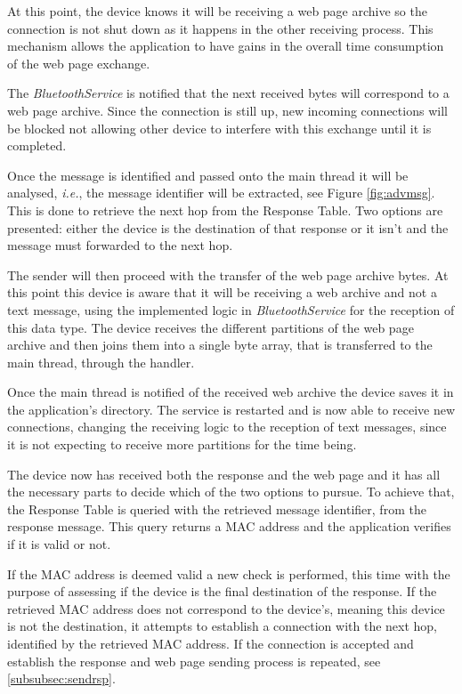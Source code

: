At this point, the device knows it will be receiving a web page archive so the connection is not shut down as it happens in the other receiving process. This mechanism allows the application to have gains in the overall time consumption of the web page exchange.

The \textit{BluetoothService} is notified that the next received bytes will correspond to a web page archive. Since the connection is still up, new incoming connections will be blocked not allowing other device to interfere with this exchange until it is completed.

Once the message is identified and passed onto the main thread it will be analysed, \textit{i.e.}, the message identifier will be extracted, see Figure \ref{fig:advmsg}. This is done to retrieve the next hop from the Response Table. Two options are presented: either the device is the destination of that response or it isn't and the message must forwarded to the next hop.

The sender will then proceed with the transfer of the web page archive bytes. At this point this device is aware that it will be receiving a web archive and not a text message, using the implemented logic in \textit{BluetoothService} for the reception of this data type. The device receives the different partitions of the web page archive and then joins them into a single byte array, that is transferred to the main thread, through the handler. 

Once the main thread is notified of the received web archive the device saves it in the application's directory. The service is restarted and is now able to receive new connections, changing the receiving logic to the reception of text messages, since it is not expecting to receive more partitions for the time being.

The device now has received both the response and the web page and it has all the necessary parts to decide which of the two options to pursue. To achieve that, the Response Table is queried with the retrieved message identifier, from the response message. This query returns a \gls{MAC} address and the application verifies if it is valid or not.

If the \gls{MAC} address is deemed valid a new check is performed, this time with the purpose of assessing if the device is the final destination of the response. If the retrieved \gls{MAC} address does not correspond to the device's, meaning this device is not the destination, it attempts to establish a connection with the next hop, identified by the retrieved \gls{MAC} address. If the connection is accepted and establish the response and web page sending process is repeated, see \ref{subsubsec:sendrsp}.

